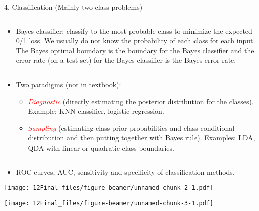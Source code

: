 \documentclass[10pt,ignorenonframetext,]{beamer}
\providecommand{\tightlist}{%
  \setlength{\itemsep}{0pt}\setlength{\parskip}{0pt}}
\begin{document}
\begin{frame}

\begin{block}{4. Classification (Mainly two-class problems)}

\(~\)

\begin{itemize}
\tightlist
\item
  Bayes classifier: classify to the most probable class to minimize the
  expected 0/1 loss. We usually do not know the probability of each
  class for each input. The Bayes optimal boundary is the boundary for
  the Bayes classifier and the error rate (on a test set) for the Bayes
  classifier is the Bayes error rate.
\end{itemize}

\(~\)

\begin{itemize}
\tightlist
\item
  Two paradigms (not in textbook):

  \begin{itemize}
  \tightlist
  \item
    \emph{\textcolor{red}{Diagnostic}} (directly estimating the
    posterior distribution for the classes). Example: KNN classifier,
    logistic regression.
  \item
    \emph{\textcolor{red}{Sampling}} (estimating class prior
    probabilities and class conditional distribution and then putting
    together with Bayes rule). Examples: LDA, QDA with linear or
    quadratic class boundaries.
  \end{itemize}
\end{itemize}

\(~\)

\begin{itemize}
\tightlist
\item
  ROC curves, AUC, sensitivity and specificity of classification
  methods.
\end{itemize}

\end{block}

\end{frame}

\begin{frame}

\texttt{[image: 12Final\_files/figure-beamer/unnamed-chunk-2-1.pdf]}

\end{frame}

\begin{frame}

\texttt{[image: 12Final\_files/figure-beamer/unnamed-chunk-3-1.pdf]}

\end{frame}
\end{document}
